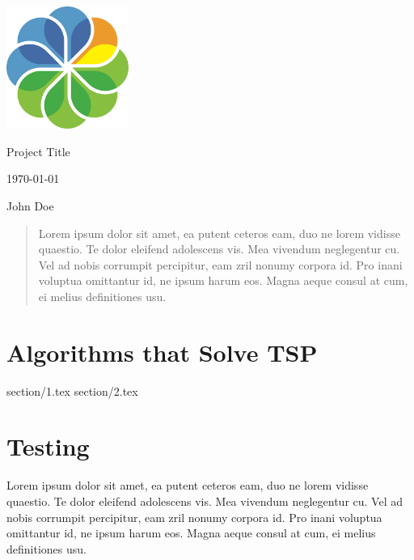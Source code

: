\documentclass[onecolumn, draftclsnofoot,10pt, compsoc]{IEEEtran}
\def \DocType{Project Title }
\def \GroupMemberOne{John Doe}
\newcommand{\NameSigPair}[1]{\par
\makebox[2.75in][r]{#1} \hfil 	\makebox[3.25in]{\makebox[2.25in]{\hrulefill} \hfill		\makebox[.75in]{\hrulefill}}
\par\vspace{-12pt} \textit{\tiny\noindent
\makebox[2.75in]{} \hfil		\makebox[3.25in]{\makebox[2.25in][r]{Signature} \hfill	\makebox[.75in][r]{Date}}}}
\renewcommand{\NameSigPair}[1]{#1}
\begin{document}
\begin{titlepage}
    \begin{singlespace}
        \hfill 
        \includegraphics[height=4cm]{fig/logo.eps}   
        \par\vspace{.2in}
        \centering
        \scshape{
            \huge \DocType \par
            {\large\today}\par
            \vspace{.5in}
            \vfill
            \vspace{5pt}
            \vspace{5pt}
            {\Large
                \NameSigPair{\GroupMemberOne}\par
            }
            \vspace{20pt}
        }
        \begin{abstract}
        Lorem ipsum dolor sit amet, ea putent ceteros eam, duo ne lorem vidisse quaestio. Te dolor eleifend adolescens vis. Mea vivendum neglegentur cu. Vel ad nobis corrumpit percipitur, eam zril nonumy corpora id. Pro inani voluptua omittantur id, ne ipsum harum eos. Magna aeque consul at cum, ei melius definitiones usu.
        \end{abstract}     
    \end{singlespace}
\end{titlepage}
\newpage
{}
\tableofcontents
\clearpage
\section{Algorithms that Solve TSP}
{section/1.tex}
{section/2.tex}


\section{Testing}
Lorem ipsum dolor sit amet, ea putent ceteros eam, duo ne lorem vidisse quaestio. Te dolor eleifend adolescens vis. Mea vivendum neglegentur cu. Vel ad nobis corrumpit percipitur, eam zril nonumy corpora id. Pro inani voluptua omittantur id, ne ipsum harum eos. Magna aeque consul at cum, ei melius definitiones usu.
\end{document}

